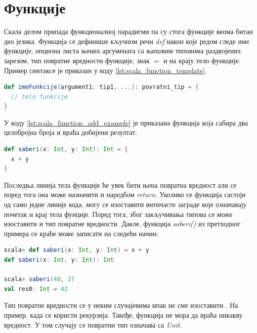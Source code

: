 \documentclass[12pt,oneside]{memoir}
\begin{document}
\section{Функције}
\label{sec:scala_funk}

Скала делом припада функционалној парадигми па су стога функције веома битан део језика. Функција се дефинише кључном речи \textit{def} након које редом следе име функције, опциона листа њених аргумената са њиховим типовима раздвојених зарезом, тип повратне вредности функције, знак $=$ и на крају тело функције. Пример синтаксе је приказан у коду \ref{lst:scala_function_template}.

\begin{lstlisting}[language=Scala, caption={Дефиниција фунције у скали}, label={lst:scala_function_template}]
def imeFunkcije(argument1: tip1, ...): povratni_tip = {
  // telo funkcije
}

\end{lstlisting}

У коду \ref{lst:scala_function_add_example} је приказана функција која сабира два целобројна броја и враћа добијени резултат. 

\begin{lstlisting}[language=Scala, caption={Дефиниција функције која сабира два целобројна броја}, label={lst:scala_function_add_example}]
def saberi(x: Int, y: Int): Int = {
  x + y
}
\end{lstlisting}

Последња линија тела функције ће увек бити њена повратна вредност али се поред тога она може назначити и наредбом \textit{return}. Уколико се функција састоји од само једне линије кода, могу се изоставити витичасте заграде које означавају почетак и крај тела фунције. Поред тога, због закључивања типова се може изоставити и тип повратне вредности. Дакле, функција \textit{saberi()} из претходног примера се краће може записати на следећи начин:

\begin{lstlisting}[language=Scala, caption={Краћи запис функције \textit{saberi()}}, label={lst:scala_function_add_example_simplified}]
scala> def saberi(x: Int, y: Int) = x + y
def saberi(x: Int, y: Int): Int

scala> saberi(40, 2)
val res0: Int = 42
\end{lstlisting}

Тип повратне вредности се у неким случајевима ипак не сме изоставити \cite{scala_prog}. На пример, када се користи рекурзија. Такође, функција не мора да враћа никакву вредност. У том случају се повратни тип означава са \textit{Unit}.
\end{document}
